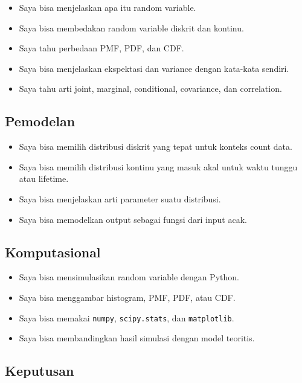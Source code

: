 \documentclass[
  letterpaper,
  DIV=11,
  numbers=noendperiod]{scrreprt}
\providecommand{\tightlist}{%
  \setlength{\itemsep}{0pt}\setlength{\parskip}{0pt}}
\begin{document}
\begin{itemize}
\tightlist
\item[$\square$]
  Saya bisa menjelaskan apa itu random variable.
\item[$\square$]
  Saya bisa membedakan random variable diskrit dan kontinu.
\item[$\square$]
  Saya tahu perbedaan PMF, PDF, dan CDF.
\item[$\square$]
  Saya bisa menjelaskan ekspektasi dan variance dengan kata-kata
  sendiri.
\item[$\square$]
  Saya tahu arti joint, marginal, conditional, covariance, dan
  correlation.
\end{itemize}

\subsection{Pemodelan}\label{pemodelan}

\begin{itemize}
\tightlist
\item[$\square$]
  Saya bisa memilih distribusi diskrit yang tepat untuk konteks count
  data.
\item[$\square$]
  Saya bisa memilih distribusi kontinu yang masuk akal untuk waktu
  tunggu atau lifetime.
\item[$\square$]
  Saya bisa menjelaskan arti parameter suatu distribusi.
\item[$\square$]
  Saya bisa memodelkan output sebagai fungsi dari input acak.
\end{itemize}

\subsection{Komputasional}\label{komputasional}

\begin{itemize}
\tightlist
\item[$\square$]
  Saya bisa mensimulasikan random variable dengan Python.
\item[$\square$]
  Saya bisa menggambar histogram, PMF, PDF, atau CDF.
\item[$\square$]
  Saya bisa memakai \texttt{numpy}, \texttt{scipy.stats}, dan
  \texttt{matplotlib}.
\item[$\square$]
  Saya bisa membandingkan hasil simulasi dengan model teoritis.
\end{itemize}

\subsection{Keputusan}\label{keputusan}
\end{document}
